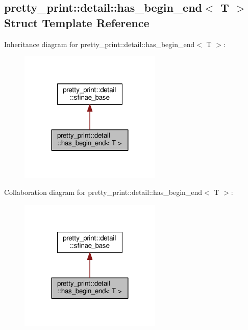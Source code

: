 \hypertarget{structpretty__print_1_1detail_1_1has__begin__end}{}\subsection{pretty\+\_\+print\+:\+:detail\+:\+:has\+\_\+begin\+\_\+end$<$ T $>$ Struct Template Reference}
\label{structpretty__print_1_1detail_1_1has__begin__end}


Inheritance diagram for pretty\+\_\+print\+:\+:detail\+:\+:has\+\_\+begin\+\_\+end$<$ T $>$\+:\nopagebreak
\begin{figure}[H]
\begin{center}
\leavevmode
\includegraphics[width=192pt]{structpretty__print_1_1detail_1_1has__begin__end__inherit__graph}
\end{center}
\end{figure}


Collaboration diagram for pretty\+\_\+print\+:\+:detail\+:\+:has\+\_\+begin\+\_\+end$<$ T $>$\+:\nopagebreak
\begin{figure}[H]
\begin{center}
\leavevmode
\includegraphics[width=192pt]{structpretty__print_1_1detail_1_1has__begin__end__coll__graph}
\end{center}
\end{figure}
